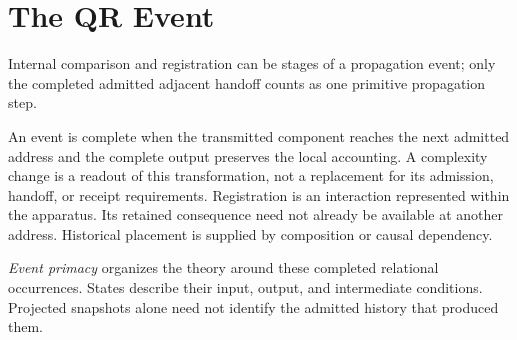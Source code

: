 \section{The QR Event}\label{sec:event}

Internal comparison and registration can be stages of a propagation event; only the completed admitted adjacent handoff counts as one primitive propagation step.

An event is complete when the transmitted component reaches the next admitted address and the complete output preserves the local accounting. A complexity change is a readout of this transformation, not a replacement for its admission, handoff, or receipt requirements. Registration is an interaction represented within the apparatus. Its retained consequence need not already be available at another address. Historical placement is supplied by composition or causal dependency.

\emph{Event primacy} organizes the theory around these completed relational occurrences. States describe their input, output, and intermediate conditions. Projected snapshots alone need not identify the admitted history that produced them.
